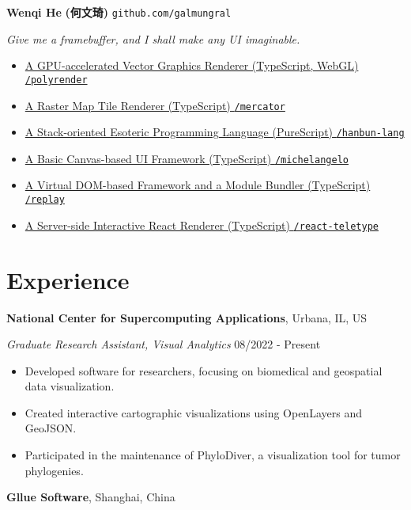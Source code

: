\documentclass[12pt]{article}
\begin{document}
{\Huge\bf Wenqi He} {\Large\bf\cjkfont (何文琦)} \hfill \texttt{github.com/galmungral}

\vspace{20pt}
\textit{Give me a framebuffer, and I shall make any UI imaginable.}

\begin{itemize}
\item \href{https://galmungral.github.io/polyrender}{A GPU-accelerated Vector Graphics Renderer (TypeScript, WebGL) \hfill \texttt{/polyrender}}
\item \href{https://galmungral.github.io/mercator?lon=-73.9855&lat=40.7580}{A Raster Map Tile Renderer (TypeScript) \hfill \texttt{/mercator}}
\item \href{https://galmungral.github.io/hanbun-lang}{A Stack-oriented Esoteric Programming Language (PureScript) \hfill \texttt{/hanbun-lang}}
\item \href{https://galmungral.github.io/michelangelo}{A Basic Canvas-based UI Framework (TypeScript) \hfill \texttt{/michelangelo}}
\item \href{https://github.com/galmungral/replay}{A Virtual DOM-based Framework and a Module Bundler (TypeScript) \hfill \texttt{/replay}}
\item\href{https://github.com/galmungral/react-teletype}{A Server-side Interactive React Renderer (TypeScript) \hfill \texttt{/react-teletype}}
\end{itemize}

\section*{Experience}

\textbf{National Center for Supercomputing Applications}, Urbana, IL, US

\textit{Graduate Research Assistant, Visual Analytics} \hfill 08/2022 - Present

\begin{itemize}
\item Developed software for researchers, focusing on biomedical and geospatial data visualization.
\item Created interactive cartographic visualizations using OpenLayers and GeoJSON.
\item Participated in the maintenance of PhyloDiver, a visualization tool for tumor phylogenies.
\end{itemize}

\textbf{Gllue Software}, Shanghai, China
\end{document}
